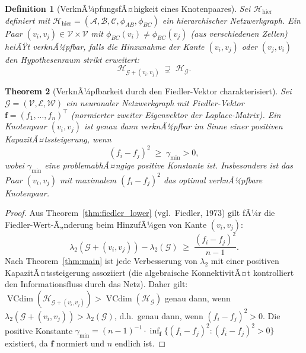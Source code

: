 ﻿\documentclass[12pt, a4paper, openany]{report}
\newtheorem{theorem}{Theorem}[chapter]
\newtheorem{definition}[theorem]{Definition}
\newcommand{\calG}{\mathcal{G}}
\newcommand{\calH}{\mathcal{H}}
\newcommand{\calV}{\mathcal{V}}
\newcommand{\calE}{\mathcal{E}}
\newcommand{\calW}{\mathcal{W}}
\newcommand{\calA}{\mathcal{A}}
\newcommand{\calB}{\mathcal{B}}
\newcommand{\calC}{\mathcal{C}}
\DeclareMathOperator{\VC}{VCdim}
\begin{document}
\begin{definition}[VerknÃ¼pfungsfÃ¤higkeit eines Knotenpaares]
\label{def:linkability}
Sei $\calH_{\mathrm{hier}}$ definiert mit $\calH_{\mathrm{hier}} = (\calA, \calB, \calC, \phi_{AB}, \phi_{BC})$
ein hierarchischer Netzwerkgraph.  Ein Paar $(v_i, v_j) \in \calV \times \calV$
mit $\phi_{BC}(v_i) \neq \phi_{BC}(v_j)$ (aus verschiedenen Zellen) heiÃŸt
\emph{verknÃ¼pfbar}, falls die Hinzunahme der Kante $(v_i, v_j)$ oder
$(v_j, v_i)$ den Hypothesenraum strikt erweitert:
\[
  \calH_{\calG + (v_i, v_j)} \;\supsetneq\; \calH_{\calG}.
\]
\end{definition}

\begin{theorem}[VerknÃ¼pfbarkeit durch den Fiedler-Vektor charakterisiert]
\label{thm:linkability_fiedler}
Sei $\calG = (\calV, \calE, \calW)$ ein neuronaler Netzwerkgraph mit
Fiedler-Vektor $\bm{f} = (f_1, \ldots, f_n)^\top$ (normierter zweiter
Eigenvektor der Laplace-Matrix).  Ein Knotenpaar $(v_i, v_j)$ ist genau
dann verknÃ¼pfbar im Sinne einer positiven KapazitÃ¤tssteigerung, wenn
\begin{equation}
  \label{eq:linkability_fiedler}
  (f_i - f_j)^2 \;\geq\; \gamma_{\min} > 0,
\end{equation}
wobei $\gamma_{\min}$ eine problemabhÃ¤ngige positive Konstante ist.
Insbesondere ist das Paar $(v_i, v_j)$ mit maximalem $(f_i - f_j)^2$
das optimal verknÃ¼pfbare Knotenpaar.
\end{theorem}

\begin{proof}
Aus Theorem~\ref{thm:fiedler_lower} (vgl.\ Fiedler, 1973) gilt fÃ¼r die
Fiedler-Wert-Ã„nderung beim HinzufÃ¼gen von Kante $(v_i, v_j)$:
\[
  \lambda_2(\calG + (v_i, v_j)) - \lambda_2(\calG)
  \;\geq\;
  \frac{(f_i - f_j)^2}{n - 1}.
\]
Nach Theorem~\ref{thm:main} ist jede Verbesserung von $\lambda_2$ mit einer
positiven KapazitÃ¤tssteigerung assoziiert (die algebraische KonnektivitÃ¤t
kontrolliert den Informationsfluss durch das Netz).  Daher gilt:
$\VC(\calH_{\calG + (v_i, v_j)}) > \VC(\calH_{\calG})$ genau dann, wenn
$\lambda_2(\calG + (v_i, v_j)) > \lambda_2(\calG)$, d.h.\ genau dann, wenn
$(f_i - f_j)^2 > 0$.  Die positive Konstante $\gamma_{\min} = (n-1)^{-1}
\cdot \inf_{\bm{f}} \{(f_i - f_j)^2 : (f_i - f_j)^2 > 0\}$ existiert, da
$\bm{f}$ normiert und $n$ endlich ist.
\end{proof}
\end{document}
